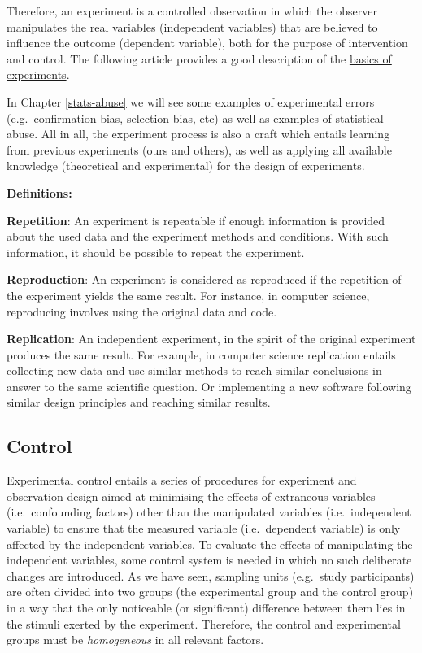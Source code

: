 \documentclass[
]{book}
\begin{document}
Therefore, an experiment is a controlled observation in which the observer manipulates the real variables (independent variables) that are believed to influence the outcome (dependent variable), both for the purpose of intervention and control. The following article provides a good description of the \href{https://opentextbc.ca/researchmethods/chapter/experiment-basics/}{basics of experiments}.

In Chapter \ref{stats-abuse} we will see some examples of experimental errors (e.g.~confirmation bias, selection bias, etc) as well as examples of statistical abuse. All in all, the experiment process is also a craft which entails learning from previous experiments (ours and others), as well as applying all available knowledge (theoretical and experimental) for the design of experiments.

\begin{tipbox}

\textbf{Definitions:}

\textbf{Repetition}: An experiment is repeatable if enough information is provided about the used data and the experiment methods and conditions. With such information, it should be possible to repeat the experiment.

\textbf{Reproduction}: An experiment is considered as reproduced if the repetition of the experiment yields the same result. For instance, in computer science, reproducing involves using the original data and code.

\textbf{Replication}: An independent experiment, in the spirit of the original experiment produces the same result. For example, in computer science replication entails collecting new data and use similar methods to reach similar conclusions in answer to the same scientific question. Or implementing a new software following similar design principles and reaching similar results.

\end{tipbox}

\hypertarget{control}{%
\subsection{Control}\label{control}}

Experimental control entails a series of procedures for experiment and observation design aimed at minimising the effects of extraneous variables (i.e.~confounding factors) other than the manipulated variables (i.e.~independent variable) to ensure that the measured variable (i.e.~dependent variable) is only affected by the independent variables. To evaluate the effects of manipulating the independent variables, some control system is needed in which no such deliberate changes are introduced. As we have seen, sampling units (e.g.~study participants) are often divided into two groups (the experimental group and the control group) in a way that the only noticeable (or significant) difference between them lies in the stimuli exerted by the experiment.
Therefore, the control and experimental groups must be \emph{homogeneous} in all relevant factors.
\end{document}

